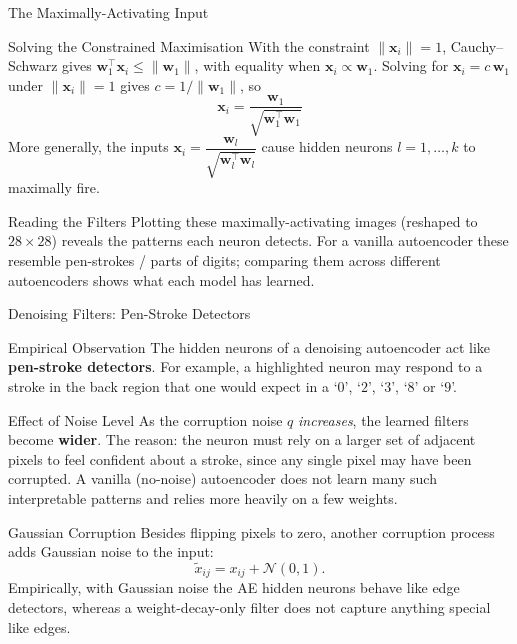 \documentclass{beamer}
\begin{document}
\begin{frame}[shrink=10]{The Maximally-Activating Input}
  \begin{block}{Solving the Constrained Maximisation}
    With the constraint $\|\mathbf{x}_i\|=1$, Cauchy--Schwarz gives
    $\mathbf{w}_1^{\top}\mathbf{x}_i \leq \|\mathbf{w}_1\|$, with equality
    when $\mathbf{x}_i \propto \mathbf{w}_1$. Solving for $\mathbf{x}_i =
    c\,\mathbf{w}_1$ under $\|\mathbf{x}_i\|=1$ gives $c = 1/\|\mathbf{w}_1\|$,
    so
    \[
      \boxed{\;
        \mathbf{x}_i = \frac{\mathbf{w}_1}{\sqrt{\mathbf{w}_1^{\top}\mathbf{w}_1}}
      \;}
    \]
    More generally, the inputs
    $\mathbf{x}_i = \dfrac{\mathbf{w}_l}{\sqrt{\mathbf{w}_l^{\top}\mathbf{w}_l}}$
    cause hidden neurons $l=1,\ldots,k$ to maximally fire.
  \end{block}

  \begin{exampleblock}{Reading the Filters}
    Plotting these maximally-activating images (reshaped to $28\times28$)
    reveals the patterns each neuron detects. For a vanilla autoencoder
    these resemble pen-strokes / parts of digits; comparing them across
    different autoencoders shows what each model has learned.
  \end{exampleblock}
\end{frame}

\begin{frame}[shrink=10]{Denoising Filters: Pen-Stroke Detectors}
  \begin{block}{Empirical Observation}
    The hidden neurons of a denoising autoencoder act like
    \textbf{pen-stroke detectors}. For example, a highlighted neuron may
    respond to a stroke in the back region that one would expect in a
    `$0$', `$2$', `$3$', `$8$' or `$9$'.
  \end{block}

  \begin{block}{Effect of Noise Level}
    As the corruption noise $q$ \emph{increases}, the learned filters
    become \textbf{wider}. The reason: the neuron must rely on a larger set
    of adjacent pixels to feel confident about a stroke, since any single
    pixel may have been corrupted. A vanilla (no-noise) autoencoder does
    not learn many such interpretable patterns and relies more heavily on a
    few weights.
  \end{block}

  \begin{exampleblock}{Gaussian Corruption}
    Besides flipping pixels to zero, another corruption process adds
    Gaussian noise to the input:
    \[
      \tilde{x}_{ij} = x_{ij} + \mathcal{N}(0,1).
    \]
    Empirically, with Gaussian noise the AE hidden neurons behave like
    edge detectors, whereas a weight-decay-only filter does not capture
    anything special like edges.
  \end{exampleblock}
\end{frame}
\end{document}
